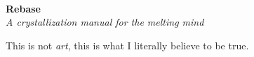 \documentclass[a4paper,hidelinks]{article}
\begin{document}

~
\vspace{95px}

\begin{center}
{\Huge \textbf{
Rebase
}}\\
\vspace{10px}
\textit{
A crystallization manual for the melting mind
}
\end{center}

\vspace{70px}

\begin{center}
\end{center}

\thispagestyle{empty}

\newpage

\begin{center}
\vspace*{\fill}
This is not \textit{art}, this is what I literally believe to be true.
\vspace*{\fill}
\end{center}

\restoregeometry
{}

\end{document}
